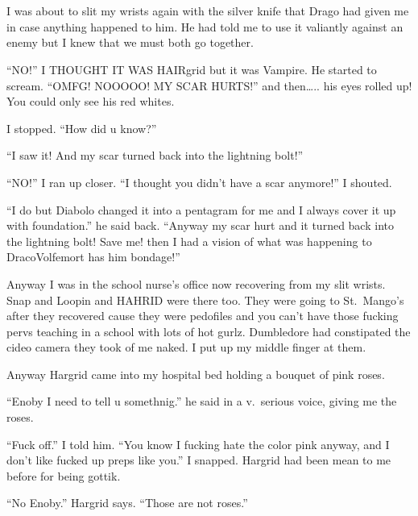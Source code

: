 \section{}



I was about to slit my wrists again with the silver knife that Drago had given me in case anything happened to him. He had told me to use it valiantly against an enemy but I knew that we must both go together.

\enquote{NO\@!} I THOUGHT IT WAS HAIRgrid but it was Vampire. He started to scream. \enquote{OMFG\@! NOOOOO\@! MY SCAR HURTS\@!} and then….. his eyes rolled up! You could only see his red whites.

I stopped. \enquote{How did u know?}

\enquote{I saw it! And my scar turned back into the lightning bolt!}

\enquote{NO\@!} I ran up closer. \enquote{I thought you didn't have a scar anymore!} I shouted.

\enquote{I do but Diabolo changed it into a pentagram for me and I always cover it up with foundation.} he said back. \enquote{Anyway my scar hurt and it turned back into the lightning bolt! Save me! then I had a vision of what was happening to Draco\dotfill Volfemort has him bondage!}

Anyway I was in the school nurse's office now recovering from my slit wrists. Snap and Loopin and HAHRID were there too. They were going to St.~Mango's after they recovered cause they were pedofiles and you can't have those fucking pervs teaching in a school with lots of hot gurlz. Dumbledore had constipated the cideo camera they took of me naked. I put up my middle finger at them.

Anyway Hargrid came into my hospital bed holding a bouquet of pink roses.

\enquote{Enoby I need to tell u somethnig.} he said in a v.\ serious voice, giving me the roses.

\enquote{Fuck off.} I told him. \enquote{You know I fucking hate the color pink anyway, and I don't like fucked up preps like you.} I snapped. Hargrid had been mean to me before for being gottik.

\enquote{No Enoby.} Hargrid says. \enquote{Those are not roses.}

